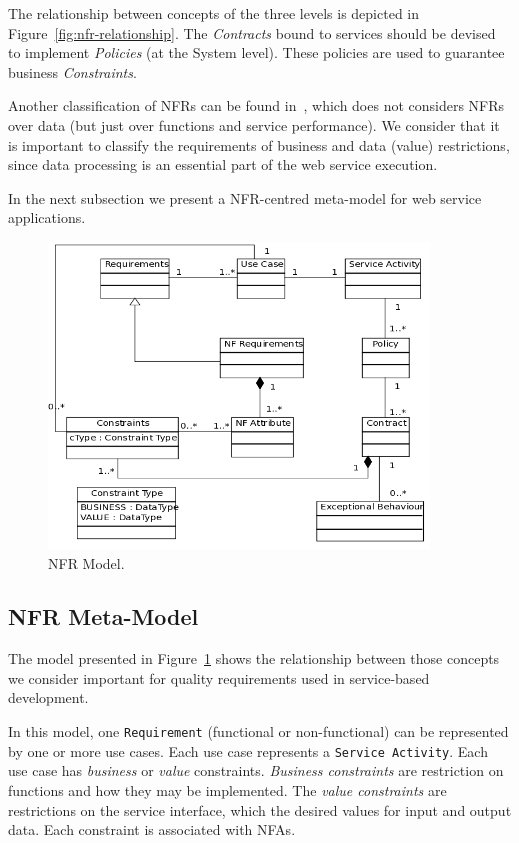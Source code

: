 \documentclass[english,12pt]{article}
\begin{document}
The relationship between concepts of the three levels is depicted in Figure~\ref{fig:nfr-relationship}.
The \textit{Contracts} bound to services should be devised to implement \textit{Policies} (at the System level).
These policies are used to guarantee business \textit{Constraints}.



Another classification of NFRs can be found in~\cite{Yeom2006}, which does not considers NFRs over data (but just over functions and service performance). 
We consider that it is important to classify the requirements of business and data (value) restrictions, since data processing is an essential part of the web service execution.

In the next subsection we present a NFR-centred meta-model for web service applications.

\begin{figure}[ht!]  
\centering  
\includegraphics[width=0.9\textwidth]{figs/metamodelo.png}
\caption{NFR Model.}
\label{fig:NRFmodel} 
\end{figure} 


\subsection{NFR Meta-Model} 
\label{sec:nfr-metamodel}

The model presented in Figure~\ref{fig:NRFmodel} shows the relationship between
those concepts
we consider important for quality requirements used
in service-based development.

In this model, one \texttt{Requirement} (functional or non-func\-tion\-al) can be represented by one or more use cases. 
Each use case represents a \texttt{Service Activity}. 
Each use case has \textit{business} or
\textit{value} constraints. 
\textit{Business constraints} are restriction on functions and how they may be implemented. The \textit{value constraints} are restrictions on
the service interface, which the desired values for input and output data. Each
constraint is associated with NFAs.
\end{document}
